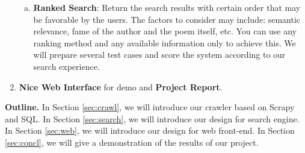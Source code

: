 \begin{enumerate}
\begin{enumerate}[a)]
          \item \textbf{Ranked Search}: Return the search results with certain order that may be favorable by the users. The factors to consider may include: semantic relevance, fame of the author and the poem itself, etc. You can use any ranking method and any available information only to achieve this. We will prepare several test cases and score the system according to our search experience.
        \end{enumerate}
  \item \textbf{Nice Web Interface} for demo and \textbf{Project Report}.
\end{enumerate}





\noindent \textbf{Outline.} In Section \ref{sec:crawl}, we will introduce our crawler based on Scrapy and SQL. In Section \ref{sec:search}, we will introduce our design for search engine. In Section \ref{sec:web}, we will introduce our design for web front-end. In Section \ref{sec:concl}, we will give a demonstration of the results of our project.